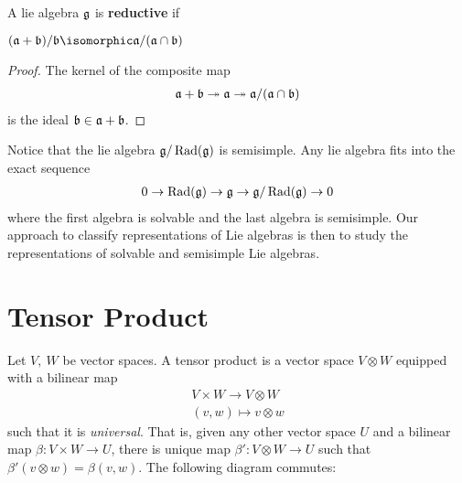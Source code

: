 \begin{definition}[Reductive]
    A lie algebra $\mathfrak{g}$ is \textbf{reductive} if
\end{definition}

\begin{lemma}
    $ (\mathfrak{a} + \mathfrak{b})/\mathfrak{b} \isomorphic \mathfrak a / (\mathfrak a \cap \mathfrak b) $
\end{lemma}
\begin{proof} The kernel of the composite map 
   \begin{align}
       \mathfrak{a} + \mathfrak{b} \twoheadrightarrow \mathfrak{a} \twoheadrightarrow \mathfrak{a}/(\mathfrak{a} \cap \mathfrak{b})
   \end{align} 
   is the ideal $\mathfrak{b} \in \mathfrak{a} + \mathfrak{b}$.
\end{proof}


Notice that the lie algebra $\mathfrak{g}/\operatorname{Rad}(\mathfrak{g})$ is semisimple. Any lie algebra fits into the exact sequence
\begin{align}
    0\to \operatorname{Rad}(\mathfrak{g}) \to \mathfrak{g} \to \mathfrak{g}/\operatorname{Rad}(\mathfrak{g}) \to 0
\end{align}
where the first algebra is solvable and the last algebra is semisimple. Our approach to classify representations of Lie  algebras is then to study the representations of solvable and semisimple Lie algebras.

\begin{theorem}
    
\end{theorem}

\appendix
\chapter{Tensor Product}
\label{cha:tensor_product}

Let $V,\ W$ be vector spaces. A tensor product is a vector space $V\otimes W$ equipped with a bilinear map
\begin{align}
    V\times W \to V\otimes W\\
    (v,w) \mapsto v\otimes w
\end{align}
such that it is \emph{universal}. That is, given any other vector space $U$ and a bilinear map $\beta: V\times W\to U$, there is unique map $\beta': V\otimes W \to U$ such that $\beta'(v\otimes w) = \beta(v,w)$. The following diagram commutes:

